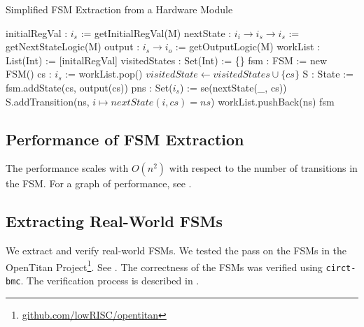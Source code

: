 \documentclass[acmsmall,screen,review]{acmart}
\begin{document}
\begin{algorithm}[H]
\caption{Simplified FSM Extraction from a Hardware Module}
\label{alg:fsm_extraction}
\begin{algorithmic}[1]
  \State initialRegVal : $i_s$ := getInitialRegVal(M)
  \State nextState : $i_i \to i_s \to i_s$ := getNextStateLogic(M)
  \State output : $i_s \to i_o$ := getOutputLogic(M)
  \State workList : List(Int) := [initalRegVal]
  \State visitedStates : Set(Int) := \{\}
  \State fsm : FSM := new FSM()
  \State cs : $i_s$ := workList.pop()
  \State $visitedState \gets visitedStates \cup \{cs\}$
   \State S : State := fsm.addState(cs, output(cs))
   \State pns : Set($i_s$) := se(nextState(\_, cs))
     \State S.addTransition(ns, $i \mapsto nextState(i, cs) = ns$)
       \State workList.pushBack(ns)
     \EndIf
   \EndFor
\EndWhile
  \State \Return fsm
\EndFunction
\end{algorithmic}
\end{algorithm}


\subsection{Performance of FSM Extraction}
The performance scales with $O(n^2)$ with respect to the number of transitions in the FSM.
For a graph of performance, see .

\subsection{Extracting Real-World FSMs}

We extract and verify real-world FSMs. We tested the pass on the FSMs in the OpenTitan Project\footnote{\href{https://github.com/lowRISC/opentitan?tab=readme-ov-file}{github.com/lowRISC/opentitan}}.
See .
The correctness of the FSMs was verified using \texttt{circt-bmc}.
The verification process is described in .

\end{document}

